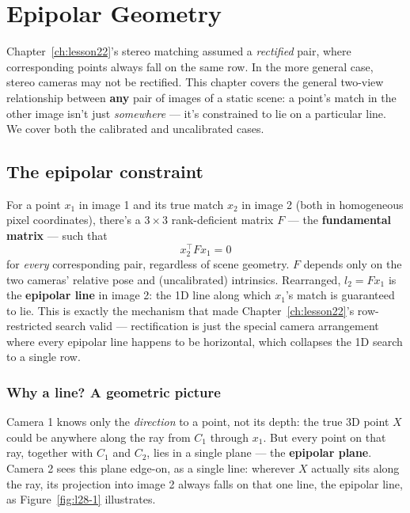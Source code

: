 \chapter{Epipolar Geometry}
\label{ch:lesson28}

Chapter~\ref{ch:lesson22}'s stereo matching assumed a \emph{rectified} pair, where corresponding points always fall on the same row. In the more general case, stereo cameras may not be rectified. This chapter covers the general two-view relationship between \textbf{any} pair of images of a static scene: a point's match in the other image isn't just \emph{somewhere} --- it's constrained to lie on a particular line. We cover both the calibrated and uncalibrated cases.

\section{The epipolar constraint}

For a point $x_1$ in image 1 and its true match $x_2$ in image 2 (both in homogeneous pixel coordinates), there's a $3\times3$ rank-deficient matrix $F$ --- the \textbf{fundamental matrix} --- such that
\begin{equation}
x_2^\top F x_1 = 0
\end{equation}
for \emph{every} corresponding pair, regardless of scene geometry. $F$ depends only on the two cameras' relative pose and (uncalibrated) intrinsics. Rearranged, $l_2=Fx_1$ is the \textbf{epipolar line} in image 2: the 1D line along which $x_1$'s match is guaranteed to lie. This is exactly the mechanism that made Chapter~\ref{ch:lesson22}'s row-restricted search valid --- rectification is just the special camera arrangement where every epipolar line happens to be horizontal, which collapses the 1D search to a single row.

\subsection*{Why a line? A geometric picture}

Camera 1 knows only the \emph{direction} to a point, not its depth: the true 3D point $X$ could be anywhere along the ray from $C_1$ through $x_1$. But every point on that ray, together with $C_1$ and $C_2$, lies in a single plane --- the \textbf{epipolar plane}. Camera 2 sees this plane edge-on, as a single line: wherever $X$ actually sits along the ray, its projection into image 2 always falls on that one line, the epipolar line, as Figure~\ref{fig:l28-1} illustrates.

